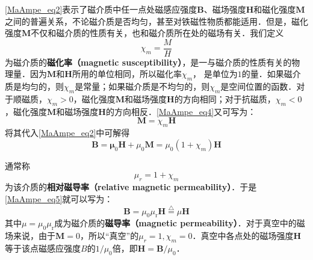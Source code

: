 \autoref{MaAmpe_eq2}表示了磁介质中任一点处磁感应强度$\mathbf B$、磁场强度$\mathbf H$和磁化强度$\mathbf M $之间的普遍关系，不论磁介质是否均匀，甚至对铁磁性物质都能适用．但是，磁化强度$\mathbf M $不仅和磁介质的性质有关，也和磁介质所在处的磁场有关．我们定义
\begin{equation} \label{MaAmpe_eq4}
\chi_{m}=\frac{M}{H}
\end{equation}
为磁介质的\textbf{磁化率（magnetic susceptibility）}，是一与磁介质的性质有关的物理量．因为$\mathbf M $和$\mathbf H $所用的单位相同，所以磁化率$\chi_m$， 是单位为$1 $的量．如果磁介质是均匀的，则$\chi_m$是常量；如果磁介质是不均匀的，则$\chi_m$是空间位置的函数．对于顺磁质，$\chi_m>0$，磁化强度$\mathbf M $和磁场强度$\mathbf H $的方向相同；对于抗磁质，$\chi_m<0$，磁化强度$\mathbf M $和磁场强度$\mathbf H $的方向相反．\autoref{MaAmpe_eq4}又可写为：
\begin{equation} \label{MaAmpe_eq5}
\mathbf M = \chi_m\mathbf H
\end{equation}
将其代入\autoref{MaAmpe_eq2}中可解得
\begin{equation}
\mathbf{B}=\mathbf{\mu}_{0} \mathbf{H}+\mu_{0} \mathbf{M}=\mu_{0}\left(1+\chi_{{m}}\right) \mathbf{H}
\end{equation}

通常称
\begin{equation}
\mu_{{r}}=1+\chi_{m}
\end{equation}
为该介质的\textbf{相对磁导率（relative magnetic permeability）}．于是\autoref{MaAmpe_eq5}就可以写为：
\begin{equation}
\mathbf B=\mu_{0} \mu_{\mathrm{r}} \mathbf H\overset{\triangle}=\mu \mathbf H
\end{equation}
其中$\mu = \mu_{0} \mu_{\mathrm{r}} $成为磁介质的\textbf{磁导率（magnetic permeability）}．对于真空中的磁场来说，由于$\mathbf M=0$，所以“真空”的$\mu_r=1,\chi_m=0$．真空中各点处的磁场强度$\mathbf H $等于该点磁感应强度$B $的$1/\mu_0$倍，即$\mathbf H = \mathbf B / \mu_0$．